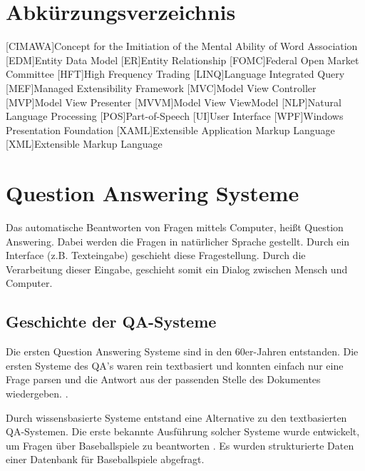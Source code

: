 \documentclass[
        ngerman,
        paper=a4,
        numbers=noendperiod,
]{scrreprt}
\begin{document}
\chapter*{Abkürzungsverzeichnis}
\begin{acronym}
[CIMAWA]{Concept for the Imitiation of the Mental Ability of Word Association}
[EDM]{Entity Data Model}
[ER]{Entity Relationship}
[FOMC]{Federal Open Market Committee}
[HFT]{High Frequency Trading}
[LINQ]{Language Integrated Query}
[MEF]{Managed Extensibility Framework}
[MVC]{Model View Controller}
[MVP]{Model View Presenter}
[MVVM]{Model View ViewModel}
[NLP]{Natural Language Processing}
[POS]{Part-of-Speech}
[UI]{User Interface}
[WPF]{Windows Presentation Foundation}
[XAML]{Extensible Application Markup Language}
[XML]{Extensible Markup Language}
\end{acronym}
\clearpage 
{} 
\listofxequations
\clearpage
\setcounter{page}{1}





\chapter{Question Answering Systeme}
Das automatische Beantworten von Fragen mittels Computer, heißt Question Answering. Dabei werden die Fragen in natürlicher Sprache gestellt. Durch ein Interface (z.B. Texteingabe) geschieht diese Fragestellung. Durch die Verarbeitung dieser Eingabe, geschieht somit ein Dialog zwischen Mensch und Computer.
\section{Geschichte der QA-Systeme}
Die ersten Question Answering Systeme sind in den 60er-Jahren entstanden. Die ersten Systeme des QA's waren rein textbasiert und konnten einfach nur eine Frage parsen und die Antwort aus der passenden Stelle des Dokumentes wiedergeben. \citep{phillips1960question}.

Durch wissensbasierte Systeme entstand eine Alternative zu den textbasierten QA-Systemen. Die erste bekannte Ausführung solcher Systeme wurde entwickelt, um Fragen über Baseballspiele zu beantworten \citep{green1986baseball}. Es wurden strukturierte Daten einer Datenbank für Baseballspiele abgefragt. 
\end{document}
